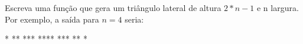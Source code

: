 
\question[10]

Escreva uma função que gera um triângulo lateral de altura $2*n-1$ e n largura. Por exemplo, a saída para $n = 4$ seria:

\begin{exemplo}{}{}
* \newline
** \newline
*** \newline
****\newline
***\newline
**\newline
*
\end{exemplo}
